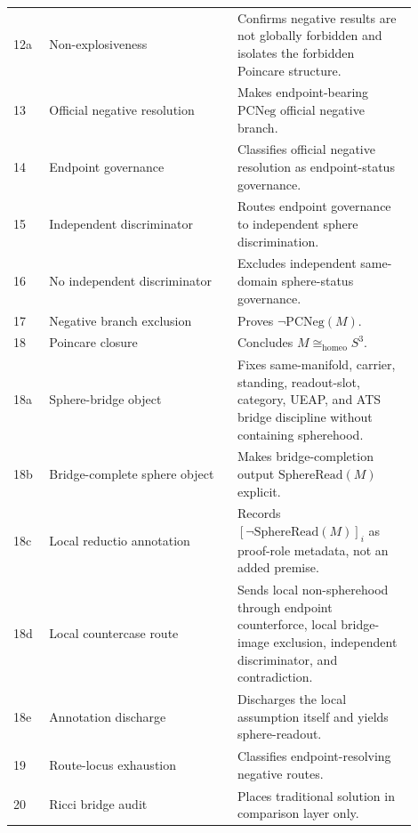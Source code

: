 \documentclass[11pt]{article}
\newcommand{\Sthree}{S^{3}}
\newcommand{\SphereRead}{\mathrm{SphereRead}}
\newcommand{\PCNeg}{\mathrm{PCNeg}}
\newcommand{\Homeo}{\cong_{\mathrm{homeo}}}
\begin{document}
\begin{longtable}{L{0.08\linewidth}L{0.42\linewidth}L{0.40\linewidth}}
12a & Non-explosiveness & Confirms negative results are not globally forbidden and isolates the forbidden Poincare structure.\\
13 & Official negative resolution & Makes endpoint-bearing \(\PCNeg\) official negative branch.\\
14 & Endpoint governance & Classifies official negative resolution as endpoint-status governance.\\
15 & Independent discriminator & Routes endpoint governance to independent sphere discrimination.\\
16 & No independent discriminator & Excludes independent same-domain sphere-status governance.\\
17 & Negative branch exclusion & Proves \(\neg\PCNeg(M)\).\\
18 & Poincare closure & Concludes \(M\Homeo\Sthree\).\\
18a & Sphere-bridge object & Fixes same-manifold, carrier, standing, readout-slot, category, UEAP, and ATS bridge discipline without containing spherehood.\\
18b & Bridge-complete sphere object & Makes bridge-completion output \(\SphereRead(M)\) explicit.\\
18c & Local reductio annotation & Records \([\neg\SphereRead(M)]_i\) as proof-role metadata, not an added premise.\\
18d & Local countercase route & Sends local non-spherehood through endpoint counterforce, local bridge-image exclusion, independent discriminator, and contradiction.\\
18e & Annotation discharge & Discharges the local assumption itself and yields sphere-readout.\\
19 & Route-locus exhaustion & Classifies endpoint-resolving negative routes.\\
20 & Ricci bridge audit & Places traditional solution in comparison layer only.\\
\bottomrule
\end{longtable}
\end{document}
